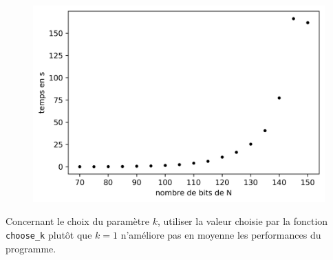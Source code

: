 \newpage
\begin{figure}[h!]
\begin{center}
\includegraphics[width = 12 cm]{graphique}
\end{center}
\end{figure}

Concernant le choix du paramètre $k$, utiliser la valeur choisie par la fonction 
\texttt{choose\_k} plutôt que $k=1$ n'améliore pas en moyenne les performances du 
programme. 
